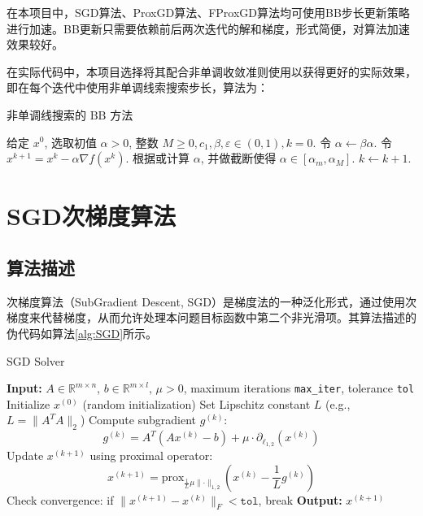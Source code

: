 \documentclass[journal, a4paper]{IEEEtran}
\begin{document}
在本项目中，SGD算法、ProxGD算法、FProxGD算法均可使用BB步长更新策略进行加速。BB更新只需要依赖前后两次迭代的解和梯度，形式简便，对算法加速效果较好。

在实际代码中，本项目选择将其配合非单调收敛准则使用以获得更好的实际效果，即在每个迭代中使用非单调线索搜索步长，算法为：

\begin{algorithm}
    \caption{非单调线搜索的 $\mathrm{BB}$ 方法}
    \begin{algorithmic}[1]
    \State 给定 $x^0$, 选取初值 $\alpha>0$, 整数 $M \geqslant 0, c_1, \beta, \varepsilon \in(0,1), k=0$.
            \State 令 $\alpha \leftarrow \beta \alpha$.
        \EndWhile
        \State 令 $x^{k+1}=x^k-\alpha \nabla f\left(x^k\right)$.
        \State 根据或计算 $\alpha$, 并做截断使得 $\alpha \in\left[\alpha_m, \alpha_M\right]$.
        \State $k \leftarrow k+1$.
    \EndWhile
    \end{algorithmic}
\end{algorithm}



\section{\textbf{SGD次梯度算法}}

\subsection{\textbf{算法描述}}
次梯度算法（SubGradient Descent, SGD）是梯度法的一种泛化形式，通过使用次梯度来代替梯度，从而允许处理本问题目标函数中第二个非光滑项。其算法描述的伪代码如算法\ref{alg:SGD}所示。

\begin{algorithm}
    \caption{SGD Solver}
    \label{alg:SGD}
    \begin{algorithmic}[1]
    \State \textbf{Input:} $A \in \mathbb{R}^{m \times n}$, $b \in \mathbb{R}^{m \times l}$, $\mu > 0$, maximum iterations \texttt{max\_iter}, tolerance \texttt{tol}
    \State Initialize $x^{(0)}$ (random initialization)
    \State Set Lipschitz constant $L$ (e.g., $L = \lVert A^TA \rVert_2$)
        \State Compute subgradient $g^{(k)}$:
        \[
        g^{(k)} = A^T(Ax^{(k)} - b) + \mu \cdot \partial_{\ell_{1,2}}(x^{(k)})
        \]
        \State Update $x^{(k+1)}$ using proximal operator:
        \[
        x^{(k+1)} = \text{prox}_{\frac{1}{L}\mu\lVert \cdot \rVert_{1,2}}\left(x^{(k)} - \frac{1}{L} g^{(k)}\right)
        \]
        \State Check convergence: if $\lVert x^{(k+1)} - x^{(k)} \rVert_F < \texttt{tol}$, break
    \EndFor
    \State \textbf{Output:} $x^{(k+1)}$
    \end{algorithmic}
\end{algorithm}
\end{document}
